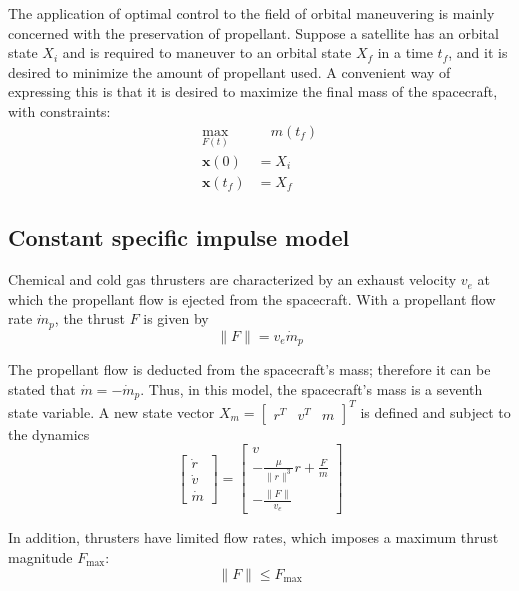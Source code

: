 The application of optimal control to the field of orbital maneuvering is mainly concerned with the preservation of propellant. Suppose a satellite has an orbital state \(X_i\) and is required to maneuver to an orbital state \(X_f\) in a time \(t_f\), and it is desired to minimize the amount of propellant used. A convenient way of expressing this is that it is desired to maximize the final mass of the spacecraft, with constraints:
\begin{align}
    \max_{F(t)}&\quad m(t_f) \label{eq:max_final_mass} \\
    \mathbf{x}(0) &= X_i \\
    \mathbf{x}(t_f) &= X_f
\end{align}

\subsection{Constant specific impulse model}

Chemical and cold gas thrusters are characterized by an exhaust velocity \(v_e\) at which the propellant flow is ejected from the spacecraft. With a propellant flow rate \(\dot{m}_p\), the thrust \(F\) is given by
\begin{equation}
   \lVert F \rVert = v_e \dot{m}_p
\end{equation}

The propellant flow is deducted from the spacecraft's mass; therefore it can be stated that \(\dot{m} = - \dot{m}_p\). Thus, in this model, the spacecraft's mass is a seventh state variable. A new state vector \(X_m = \begin{bmatrix}
    r^T & v^T & m 
\end{bmatrix}^T\) is defined and subject to the dynamics
\begin{equation}
    \begin{bmatrix}
        \dot{r} \\ \dot{v} \\ \dot{m}
    \end{bmatrix} = \begin{bmatrix}
        v \\ -\frac{\mu}{\lVert r \rVert^3}r + \frac{F}{m} \\ -\frac{\lVert F \rVert}{v_e}
    \end{bmatrix}
\end{equation}

In addition, thrusters have limited flow rates, which imposes a maximum thrust magnitude \(F_{\max}\):
\begin{equation}
    \lVert F \rVert \leq F_{\max}
\end{equation}

